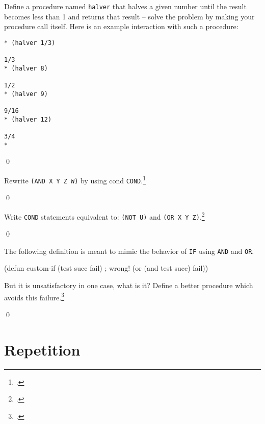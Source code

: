 \documentclass[a4paper,11pt]{article}
\begin{document}
\begin{uexercise}
Define a procedure named \Verb+halver+ that halves a given number until the result becomes less than 1 and returns that result -- solve the problem by making your procedure call itself. Here is an example interaction with such a procedure:

\begin{ucodeframe}
\begin{Verbatim}
* (halver 1/3)

1/3
* (halver 8)

1/2
* (halver 9)

9/16
* (halver 12)

3/4
*
\end{Verbatim}
\end{ucodeframe}

\qed
\end{uexercise}




\begin{uexercise}

Rewrite \Verb+(AND X Y Z W)+ by using cond \Verb+COND+.\footnote{.}

\qed
\end{uexercise}

\begin{uexercise}
Write \Verb+COND+ statements equivalent to: \Verb+(NOT U)+ and \Verb+(OR X Y Z)+.\footnote{.}

\qed
\end{uexercise}


\begin{uexercise}
The following definition is meant to mimic the behavior of \Verb+IF+ using \Verb+AND+ and \Verb+OR+.

\begin{lispcode}
(defun custom-if (test succ fail) ; wrong!
  (or (and test succ) fail))
\end{lispcode}

But it is unsatisfactory in one case, what is it? 
Define a better procedure which avoids this failure.\footnote{.}

\qed
\end{uexercise}

\noindent\hrulefill

\newpage


\section{Repetition}
\end{document}
